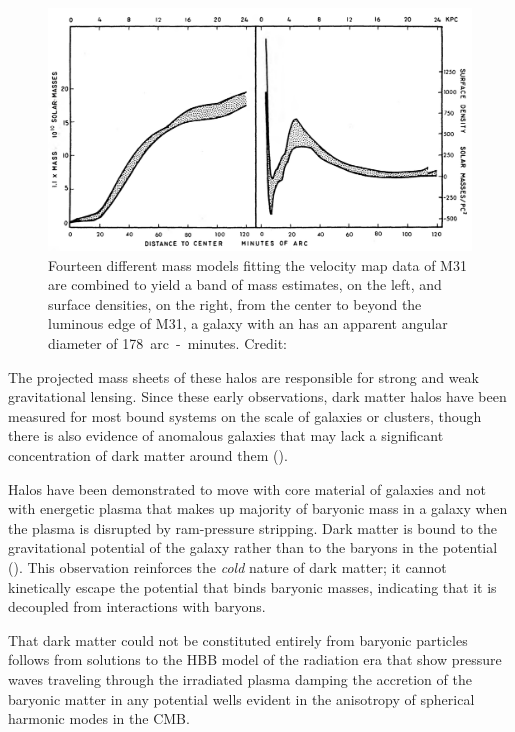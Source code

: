 \documentclass{paper}
\begin{document}
  \begin{figure}[H]
    \begin{centering}
    \includegraphics[scale=0.4]{DM-masscurve.pdf}
    \caption{Fourteen different mass models fitting the velocity map data of
      M31 are combined to yield a band of mass estimates, on the left, and 
      surface densities, on the right, from the center to beyond the luminous 
      edge of M31, a galaxy with an has an apparent angular diameter of 
      \SI{178}{arc-minutes}.
    Credit: \cite{1970ApJ...159..379R}}
    \label{fig:DM-masscurve}
    \end{centering}
  \end{figure}

  The projected mass sheets of these halos are responsible for strong and weak 
  gravitational lensing. Since these early observations, dark matter halos 
  have been measured for most bound systems on the scale of galaxies or 
  clusters, though there is also evidence of anomalous galaxies that may lack 
  a significant concentration of dark matter around them 
  (\cite{10.1093/mnras/stab3491}). 

  Halos have been demonstrated to move with core material of galaxies and not 
  with energetic plasma that makes up majority of baryonic mass in a galaxy when 
  the plasma is disrupted by ram-pressure stripping. 
  Dark matter is bound to the gravitational potential of the galaxy rather 
  than to the baryons in the potential (\cite{Clowe_2006}). This observation 
  reinforces the \textit{cold} nature of dark matter; it cannot kinetically 
  escape the potential that binds baryonic masses, indicating that it 
  is decoupled from interactions with baryons. 

  That dark matter could not be constituted entirely from baryonic particles
  follows from 
  solutions to the HBB model of the radiation era that show 
  pressure waves traveling through the irradiated plasma damping the
  accretion of the baryonic matter in any potential wells evident in the 
  anisotropy of spherical harmonic modes in the CMB.
\end{document}
